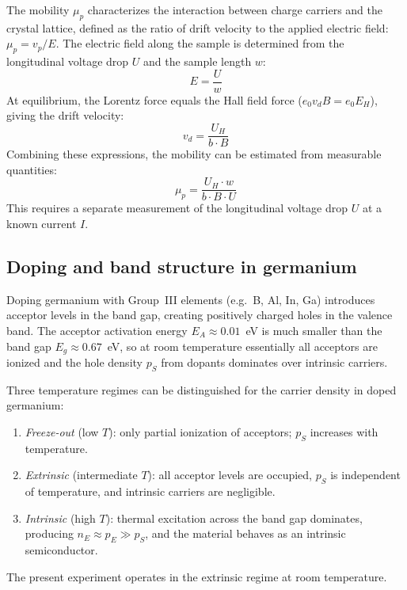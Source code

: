 \documentclass[%
 reprint,
 amsmath,amssymb,
 aps,
]{revtex4-2}
\begin{document}
The mobility $\mu_p$ characterizes the interaction between charge carriers and the crystal lattice, defined as the ratio of drift velocity to the applied electric field: $\mu_p = v_p / E$. The electric field along the sample is determined from the longitudinal voltage drop $U$ and the sample length $w$:
\begin{equation}
  E = \frac{U}{w}
\end{equation}
At equilibrium, the Lorentz force equals the Hall field force ($e_0 v_d B = e_0 E_H$), giving the drift velocity:
\begin{equation}
  v_d = \frac{U_H}{b \cdot B}
\end{equation}
Combining these expressions, the mobility can be estimated from measurable quantities:
\begin{equation}
  \mu_p = \frac{U_H \cdot w}{b \cdot B \cdot U}
  \label{eq:mobility}
\end{equation}
This requires a separate measurement of the longitudinal voltage drop $U$ at a known current $I$.


\subsection{Doping and band structure in germanium}

Doping germanium with Group~III elements (e.g.\ B, Al, In, Ga) introduces acceptor levels in the band gap, creating positively charged holes in the valence band. The acceptor activation energy $E_A \approx 0.01$~eV is much smaller than the band gap $E_g \approx 0.67$~eV, so at room temperature essentially all acceptors are ionized and the hole density $p_S$ from dopants dominates over intrinsic carriers.

Three temperature regimes can be distinguished for the carrier density in doped germanium:
\begin{enumerate}
  \item \textit{Freeze-out} (low $T$): only partial ionization of acceptors; $p_S$ increases with temperature.
  \item \textit{Extrinsic} (intermediate $T$): all acceptor levels are occupied, $p_S$ is independent of temperature, and intrinsic carriers are negligible.
  \item \textit{Intrinsic} (high $T$): thermal excitation across the band gap dominates, producing $n_E \approx p_E \gg p_S$, and the material behaves as an intrinsic semiconductor.
\end{enumerate}
The present experiment operates in the extrinsic regime at room temperature.
\end{document}
